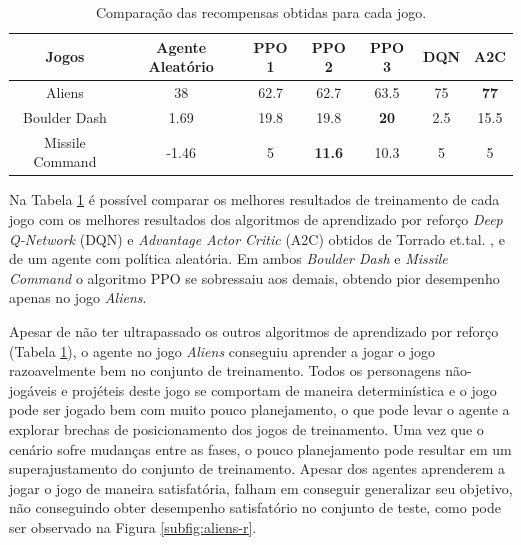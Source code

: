 \begin{table}[H]
\centering
 \begin{tabular}{||c c c c c c c ||} 
 \hline
 Jogos & Agente Aleatório & PPO 1 & PPO 2 & PPO 3 & DQN & A2C\\ [0.5ex] 
 \hline\hline
 Aliens & 38 & 62.7 & 62.7 & 63.5 & 75 & \textbf{77}\\ [1ex] 
 \hline
 Boulder Dash &  1.69 & 19.8 & 19.8 & \textbf{20} & 2.5 & 15.5\\ [1ex] 
 \hline
 Missile Command & -1.46 & 5 & \textbf{11.6} & 10.3 & 5 & 5\\ [1ex] 
 \hline
\end{tabular}
\caption{Comparação das recompensas obtidas para cada jogo.}
\label{tab:allgames}
\end{table}

Na Tabela \ref{tab:allgames} é possível comparar os melhores resultados de treinamento de cada jogo com os melhores resultados dos algoritmos de aprendizado por reforço \textit{Deep Q-Network} (DQN) \cite{mnih13} e \textit{Advantage Actor Critic} (A2C) \cite{openaibaselines} obtidos de Torrado et.tal. \cite{torrado18}, e de um agente com política aleatória. Em ambos \textit{Boulder Dash} e \textit{Missile Command} o algoritmo PPO se sobressaiu aos demais, obtendo pior desempenho apenas no jogo \textit{Aliens}.

Apesar de não ter ultrapassado os outros algoritmos de aprendizado por reforço (Tabela \ref{tab:allgames}), o agente no jogo \textit{Aliens} conseguiu aprender a jogar o jogo razoavelmente bem no conjunto de treinamento. Todos os personagens não-jogáveis e projéteis deste jogo se comportam de maneira determinística e o jogo pode ser jogado bem com muito pouco planejamento, o que pode levar o agente a explorar brechas de posicionamento dos jogos de treinamento. Uma vez que o cenário sofre mudanças entre as fases, o pouco planejamento pode resultar em um superajustamento do conjunto de treinamento. Apesar dos agentes aprenderem a jogar o jogo de maneira satisfatória, falham em conseguir generalizar seu objetivo, não conseguindo obter desempenho satisfatório no conjunto de teste, como pode ser observado na Figura \ref{subfig:aliens-r}. 


